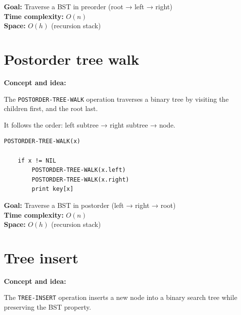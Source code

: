 \documentclass[11pt,a4paper,openany]{book}
\begin{document}
\textbf{Goal:} Traverse a BST in preorder (root → left → right) \\

\textbf{Time complexity:} $O(n)$ \\

\textbf{Space:} $O(h)$ (recursion stack)









\vspace{2cm}



\section{Postorder tree walk}

\textbf{Concept and idea:}

The \texttt{POSTORDER-TREE-WALK} operation traverses a binary tree by visiting the children first, and the root last.

It follows the order: left subtree → right subtree → node.

\begin{lstlisting}
POSTORDER-TREE-WALK(x)

    if x != NIL
        POSTORDER-TREE-WALK(x.left)
        POSTORDER-TREE-WALK(x.right)
        print key[x]
\end{lstlisting}

\textbf{Goal:} Traverse a BST in postorder (left → right → root) \\

\textbf{Time complexity:} $O(n)$ \\

\textbf{Space:} $O(h)$ (recursion stack)

















\vspace{2cm}

\section{Tree insert}
\textbf{Concept and idea:}

The \texttt{TREE-INSERT} operation inserts a new node into a binary search tree while preserving the BST property.
\end{document}
